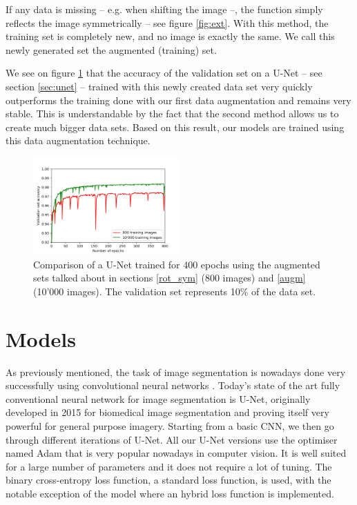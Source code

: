 \documentclass[10pt,conference,a4paper]{IEEEtran}
\begin{document}
If any data is missing -- e.g. when shifting the image \mbox{--,} the function simply reflects the image symmetrically -- see figure \ref{fig:ext}.
With this method, the training set is completely new, and no image is exactly the same.
We call this newly generated set the augmented (training) set.

We see on figure \ref{fig:val_acc} that the accuracy of the validation set on a U-Net -- see section \ref{sec:unet} -- trained with this newly created data set very quickly outperforms the training done with our first data augmentation and remains very stable.
This is understandable by the fact that the second method allows us to create much bigger data sets.
Based on this result, our models are trained using this data augmentation technique.

\begin{figure}[ht]
    \includegraphics[width=0.5\textwidth]{project2/report/images/validation_graph.png}
    \caption{Comparison of a U-Net trained for 400 epochs using the augmented sets talked about in sections \ref{rot_sym} (800 images) and \ref{augm} (10'000 images). The validation set represents 10\% of the data set.}
    \centering
    \label{fig:val_acc}
\end{figure}

\section{Models}
\label{Models}

As previously mentioned, the task of image segmentation is nowadays done very successfully using convolutional neural networks \cite{cnn_seg}.
Today's state of the art fully conventional neural network for image segmentation is U-Net, originally developed in 2015 for biomedical image segmentation and proving itself very powerful for general purpose imagery.
Starting from a basic CNN, we then go through different iterations of U-Net.
All our U-Net versions use the optimiser named Adam \cite{kingma2014adam} that is very popular nowadays in computer vision.
It is well suited for a large number of parameters and it does not require a lot of tuning.
The binary cross-entropy loss function, a standard loss function, is used, with the notable exception of the model where an hybrid loss function is implemented.
\end{document}
